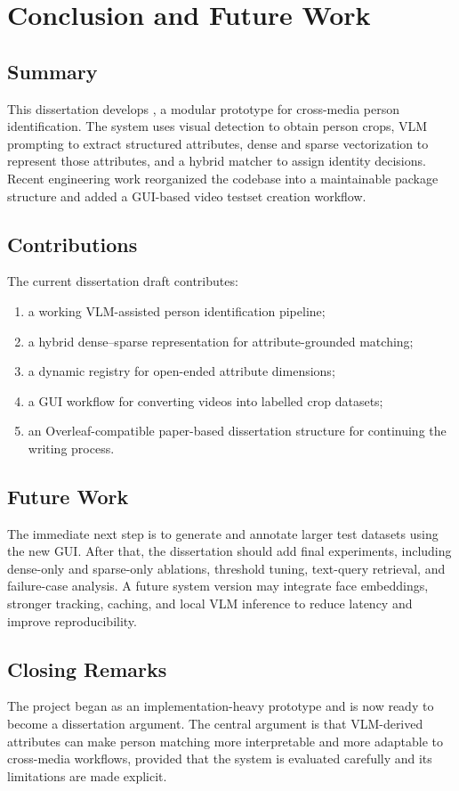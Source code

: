 \chapter{Conclusion and Future Work}
\label{ch:conclusion}

\section{Summary}

This dissertation develops \systemname, a modular prototype for cross-media person identification. The system uses visual detection to obtain person crops, VLM prompting to extract structured attributes, dense and sparse vectorization to represent those attributes, and a hybrid matcher to assign identity decisions. Recent engineering work reorganized the codebase into a maintainable package structure and added a GUI-based video testset creation workflow.

\section{Contributions}

The current dissertation draft contributes:

\begin{enumerate}
  \item a working VLM-assisted person identification pipeline;
  \item a hybrid dense--sparse representation for attribute-grounded matching;
  \item a dynamic registry for open-ended attribute dimensions;
  \item a GUI workflow for converting videos into labelled crop datasets;
  \item an Overleaf-compatible paper-based dissertation structure for continuing the writing process.
\end{enumerate}

\section{Future Work}

The immediate next step is to generate and annotate larger test datasets using the new GUI. After that, the dissertation should add final experiments, including dense-only and sparse-only ablations, threshold tuning, text-query retrieval, and failure-case analysis. A future system version may integrate face embeddings, stronger tracking, caching, and local VLM inference to reduce latency and improve reproducibility.

\section{Closing Remarks}

The project began as an implementation-heavy prototype and is now ready to become a dissertation argument. The central argument is that VLM-derived attributes can make person matching more interpretable and more adaptable to cross-media workflows, provided that the system is evaluated carefully and its limitations are made explicit.
